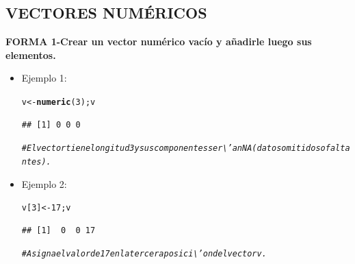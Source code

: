 \documentclass[12pt,letterpaper]{article}\usepackage[]{graphicx}\usepackage[]{color}
\makeatletter
\newcommand{\hlnum}[1]{\textcolor[rgb]{0.686,0.059,0.569}{#1}}%
\newcommand{\hlcom}[1]{\textcolor[rgb]{0.678,0.584,0.686}{\textit{#1}}}%
\newcommand{\hlstd}[1]{\textcolor[rgb]{0.345,0.345,0.345}{#1}}%
\newcommand{\hlkwb}[1]{\textcolor[rgb]{0.69,0.353,0.396}{#1}}%
\newcommand{\hlkwd}[1]{\textcolor[rgb]{0.737,0.353,0.396}{\textbf{#1}}}%
\newenvironment{kframe}{%
 \def\at@end@of@kframe{}%
 \ifinner\ifhmode%
  \def\at@end@of@kframe{\end{minipage}}%
  \begin{minipage}{\columnwidth}%
 \fi\fi%
 \def\FrameCommand##1{\hskip\@totalleftmargin \hskip-\fboxsep
 \colorbox{shadecolor}{##1}\hskip-\fboxsep
     \hskip-\linewidth \hskip-\@totalleftmargin \hskip\columnwidth}%
 \MakeFramed {\advance\hsize-\width
   \@totalleftmargin\z@ \linewidth\hsize
   \@setminipage}}%
 {\par\unskip\endMakeFramed%
 \at@end@of@kframe}
\newenvironment{knitrout}{}{} %
\makeatother
\begin{document}
\subsection{VECTORES NUM\'ERICOS}
\textbf{FORMA 1-Crear un vector num\'erico vac\'io y a\~nadirle luego sus elementos.}
\begin{itemize}
\item Ejemplo 1:
\begin{knitrout}
\color{fgcolor}\begin{kframe}
\begin{alltt}
\hlstd{v} \hlkwb{<-} \hlkwd{numeric}\hlstd{(}\hlnum{3}\hlstd{);v}
\end{alltt}
\begin{verbatim}
## [1] 0 0 0
\end{verbatim}
\begin{alltt}
\hlcom{# El vector tiene longitud 3 y sus componentes ser\textbackslash{}'an NA (datos omitidos o faltantes).}
\end{alltt}
\end{kframe}
\end{knitrout}
\item Ejemplo 2: 
\begin{knitrout}
\color{fgcolor}\begin{kframe}
\begin{alltt}
\hlstd{v[}\hlnum{3}\hlstd{]} \hlkwb{<-} \hlnum{17}\hlstd{; v}
\end{alltt}
\begin{verbatim}
## [1]  0  0 17
\end{verbatim}
\begin{alltt}
\hlcom{# Asigna el valor de 17 en la tercera posici\textbackslash{}'on del vector v.}
\end{alltt}
\end{kframe}
\end{knitrout}
\end{itemize}
\end{document}
